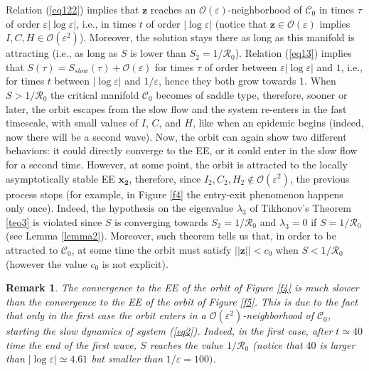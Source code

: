 \documentclass[11pt,reqno]{amsart}
\theoremstyle{boldremark}
\newtheorem{remark}{Remark}
\begin{document}
Relation (\ref{eq122}) implies that $\mathbf{z}$ reaches an $\mathcal{O}(\varepsilon)$-neighborhood of $\mathcal{C}_0$ in times $\tau$ of order $\varepsilon |\log{\varepsilon}|$, i.e., in times $t$ of order $|\log{\varepsilon}|$ (notice that $\mathbf{z} \in \mathcal{O}(\varepsilon)$ implies $I,C,H \in \mathcal{O}(\varepsilon^2)$). Moreover, the solution stays there as long as this manifold is attracting (i.e., as long as $S$ is lower than $S_2=1/\mathcal{R}_0$). Relation (\ref{eq13}) implies that $S(\tau) = S_{slow}(\tau) + \mathcal{O}(\varepsilon)$ for times $\tau$ of order between $\varepsilon |\log \varepsilon|$ and $1$, i.e., for times $t$ between $|\log \varepsilon|$ and $1/\varepsilon$, hence they both grow towards $1$. When $S>1/\mathcal{R}_0$ the critical manifold $\mathcal{C}_0$ becomes of saddle type, therefore, sooner or later, the orbit escapes from the slow flow and the system re-enters in the fast timescale, with small values of $I$, $C$, and $H$, like when an epidemic begins (indeed, now there will be a second wave). Now, the orbit can again show two different behaviors: it could directly converge to the EE, or it could enter in the slow flow for a second time. However, at some point, the orbit is attracted to the locally asymptotically stable EE $\mathbf{x_2}$, therefore, since $I_2,C_2,H_2 \not\in \mathcal{O}(\varepsilon^2)$, the previous process stops (for example, in Figure \ref{f4} the entry-exit phenomenon happens only once). Indeed, the hypothesis on the eigenvalue $\lambda_3$ of Tikhonov's Theorem \ref{teo3} is violated since $S$ is converging towards $S_2=1/\mathcal{R}_0$ and $\lambda_3=0$ if $S=1/\mathcal{R}_0$ (see Lemma \ref{lemma2}). Moreover, such theorem tells us that, in order to be attracted to $\mathcal{C}_0$, at some time the orbit must satisfy $|| \mathbf{z} || < c_0 $ when $S < 1/\mathcal{R}_0$ (however the value $c_0$ is not explicit). 

\begin{remark}
    The convergence to the EE of the orbit of Figure \ref{f4} is much slower than the convergence to the EE of the orbit of Figure \ref{f5}. This is due to the fact that only in the first case the orbit enters in a $\mathcal{O}(\varepsilon^2)$-neighborhood of $\mathcal{C}_0$, starting the slow dynamics of system (\ref{eq2}). Indeed, in the first case, after $t \simeq 40$ time the end of the first wave, $S$ reaches the value $1/\mathcal{R}_0$ (notice that $40$ is larger than $|\log \varepsilon| \simeq 4.61$ but smaller than $1/\varepsilon = 100)$. 
\end{remark}
\end{document}
